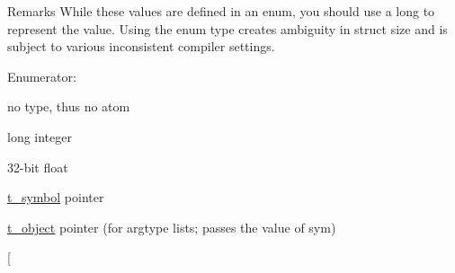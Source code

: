 \begin{DoxyRemark}{Remarks}
While these values are defined in an enum, you should use a long to represent the value. Using the enum type creates ambiguity in struct size and is subject to various inconsistent compiler settings. 
\end{DoxyRemark}
\begin{Desc}
\item[Enumerator: ]\par
\begin{description}
\item[{\em 
\hypertarget{group__atom_gga8aa6700e9f00b132eb376db6e39ade47a858ddb5d5927eae3fd699a82c7e174b6}{
A\_\-NOTHING}
\label{group__atom_gga8aa6700e9f00b132eb376db6e39ade47a858ddb5d5927eae3fd699a82c7e174b6}
}]no type, thus no atom \item[{\em 
\hypertarget{group__atom_gga8aa6700e9f00b132eb376db6e39ade47a002f28879581a6f66ea492b994b96f1e}{
A\_\-LONG}
\label{group__atom_gga8aa6700e9f00b132eb376db6e39ade47a002f28879581a6f66ea492b994b96f1e}
}]long integer \item[{\em 
\hypertarget{group__atom_gga8aa6700e9f00b132eb376db6e39ade47a0b3aa0ab8104573dfc9cb70b5b08031f}{
A\_\-FLOAT}
\label{group__atom_gga8aa6700e9f00b132eb376db6e39ade47a0b3aa0ab8104573dfc9cb70b5b08031f}
}]32-\/bit float \item[{\em 
\hypertarget{group__atom_gga8aa6700e9f00b132eb376db6e39ade47a2d661c2a5d949566e2f1944c99bceeea}{
A\_\-SYM}
\label{group__atom_gga8aa6700e9f00b132eb376db6e39ade47a2d661c2a5d949566e2f1944c99bceeea}
}]\hyperlink{structt__symbol}{t\_\-symbol} pointer \item[{\em 
\hypertarget{group__atom_gga8aa6700e9f00b132eb376db6e39ade47a82cc76e0d53c8fc28df167c35d5bbd1a}{
A\_\-OBJ}
\label{group__atom_gga8aa6700e9f00b132eb376db6e39ade47a82cc76e0d53c8fc28df167c35d5bbd1a}
}]\hyperlink{structt__object}{t\_\-object} pointer (for argtype lists; passes the value of sym) \item[{\em 
\hypertarget{group__atom_gga8aa6700e9f00b132eb376db6e39ade47a7bd979db3dcf86909e24a1d1452e2205}{
}}
\end{description}
\end{Desc}
